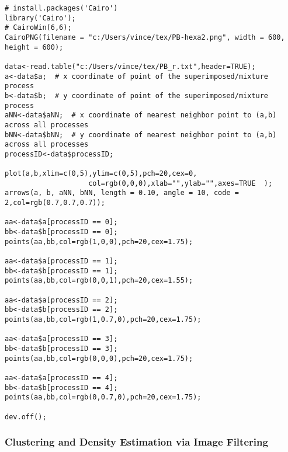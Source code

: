 \documentclass[10pt]{article}
\begin{document}
\begin{lstlisting}
# install.packages('Cairo')
library('Cairo');
# CairoWin(6,6);
CairoPNG(filename = "c:/Users/vince/tex/PB-hexa2.png", width = 600, height = 600);

data<-read.table("c:/Users/vince/tex/PB_r.txt",header=TRUE);
a<-data$a;  # x coordinate of point of the superimposed/mixture process
b<-data$b;  # y coordinate of point of the superimposed/mixture process
aNN<-data$aNN;  # x coordinate of nearest neighbor point to (a,b) across all processes
bNN<-data$bNN;  # y coordinate of nearest neighbor point to (a,b) across all processes
processID<-data$processID;

plot(a,b,xlim=c(0,5),ylim=c(0,5),pch=20,cex=0,
                    col=rgb(0,0,0),xlab="",ylab="",axes=TRUE  );
arrows(a, b, aNN, bNN, length = 0.10, angle = 10, code = 2,col=rgb(0.7,0.7,0.7));

aa<-data$a[processID == 0];
bb<-data$b[processID == 0];
points(aa,bb,col=rgb(1,0,0),pch=20,cex=1.75);

aa<-data$a[processID == 1];
bb<-data$b[processID == 1];
points(aa,bb,col=rgb(0,0,1),pch=20,cex=1.55);

aa<-data$a[processID == 2];
bb<-data$b[processID == 2];
points(aa,bb,col=rgb(1,0.7,0),pch=20,cex=1.75);

aa<-data$a[processID == 3];
bb<-data$b[processID == 3];
points(aa,bb,col=rgb(0,0,0),pch=20,cex=1.75);

aa<-data$a[processID == 4];
bb<-data$b[processID == 4];
points(aa,bb,col=rgb(0,0.7,0),pch=20,cex=1.75);

dev.off();

\end{lstlisting}

\subsubsection{Clustering and Density Estimation via Image Filtering}\label{plgd}
\end{document}
